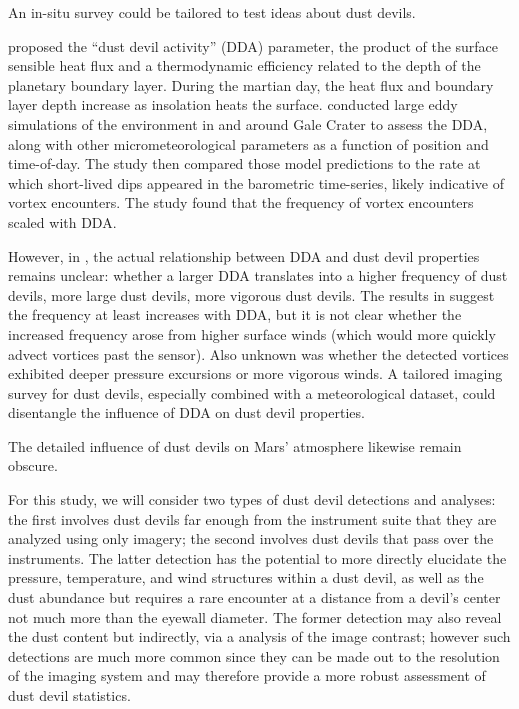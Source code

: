 \documentclass{aastex63}
\begin{document}

An in-situ survey could be tailored to test ideas about dust devils. 

\citet{1998JAtS...55.3244R} proposed the ``dust devil activity'' (DDA) parameter, the product of the surface sensible heat flux and a thermodynamic efficiency related to the depth of the planetary boundary layer. During the martian day, the heat flux and boundary layer depth increase as insolation heats the surface. \citet{2019JGRE..124.3442N} conducted large eddy simulations of the environment in and around Gale Crater to assess the DDA, along with other micrometeorological parameters as a function of position and time-of-day. The study then compared those model predictions to the rate at which short-lived dips appeared in the barometric time-series, likely indicative of vortex encounters. The study found that the frequency of vortex encounters scaled with DDA.

However, in \citet{1998JAtS...55.3244R}, the actual relationship between DDA and dust devil properties remains unclear: whether a larger DDA translates into a higher frequency of dust devils, more large dust devils, more vigorous dust devils. The results in \citet{2019JGRE..124.3442N} suggest the frequency at least increases with DDA, but it is not clear whether the increased frequency arose from higher surface winds (which would more quickly advect vortices past the sensor). Also unknown was whether the detected vortices exhibited deeper pressure excursions or more vigorous winds. A tailored imaging survey for dust devils, especially combined with a meteorological dataset, could disentangle the influence of DDA on dust devil properties. 

The detailed influence of dust devils on Mars' atmosphere likewise remain obscure. 

For this study, we will consider two types of dust devil detections and analyses: the first involves dust devils far enough from the instrument suite that they are analyzed using only imagery; the second involves dust devils that pass over the instruments. The latter detection has the potential to more directly elucidate the pressure, temperature, and wind structures within a dust devil, as well as the dust abundance but requires a rare encounter at a distance from a devil's center not much more than the eyewall diameter. The former detection may also reveal the dust content but indirectly, via a analysis of the image contrast; however such detections are much more common since they can be made out to the resolution of the imaging system and may therefore provide a more robust assessment of dust devil statistics. 
\end{document}

